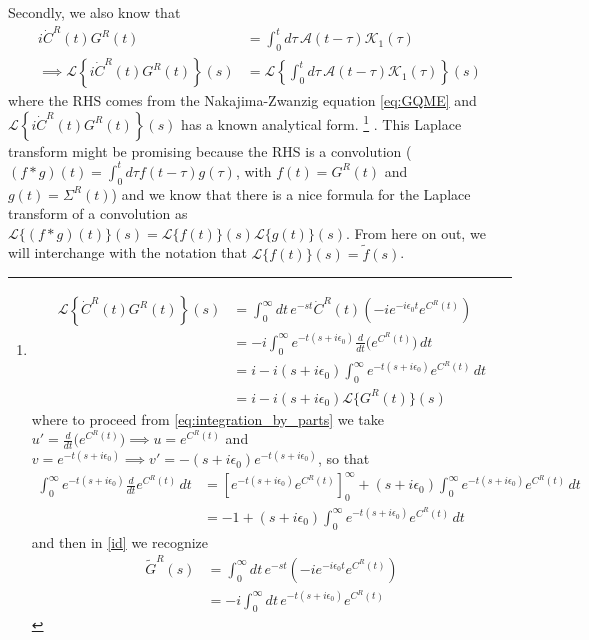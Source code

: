  Secondly, we also know that 
\begin{align}
i \dot{C}^R(t) G^R(t) &= \int_{0}^{t} d \tau\, \mathcal{A}(t - \tau) \mathcal{K}_1(\tau)  \\  
\implies \mathcal{L}\left\{i \dot{C}^R(t) G^R(t)\right\}(s) &= \mathcal{L}\left\{\int_{0}^{t} d \tau\, \mathcal{A}(t - \tau) \mathcal{K}_1(\tau)\right\}(s)
\end{align}
where the RHS comes from the Nakajima-Zwanzig equation \eqref{eq:GQME} and $\mathcal{L}\left\{i \dot{C}^R(t) G^R(t)\right\}(s) $ has a known analytical form.
\footnote{
\begin{align}
\mathcal{L}\left\{\dot{C}^R(t)G^R(t)\right\}(s)
&=\int_0^\infty dt\, e^{-s t} \dot{C}^R(t) \left(-i e^{-i \epsilon_0 t} e^{C^R(t)}\right) \\
&= -i \int_0^\infty e^{-t(s + i\epsilon_0)} \frac{d}{dt}\big(e^{C^R(t)}\big)\, dt \label{eq:integration_by_parts}\\
&= i - i(s + i\epsilon_0)\int_0^\infty e^{-t(s + i\epsilon_0)} e^{C^R(t)}\,dt \label{id}\\
&= i - i(s + i\epsilon_0)\mathcal{L}\{G^R(t)\}(s)
\end{align}
where to proceed from \eqref{eq:integration_by_parts} we take $u' = \frac{d}{dt}\big(e^{C^R(t)}\big) \implies u = e^{C^R(t)}$ and $v = e^{-t(s + i\epsilon_0)} \implies v' = - (s + i\epsilon_0)e^{-t(s + i\epsilon_0)}$, so that
\begin{align}
\int_0^\infty e^{-t(s + i\epsilon_0)} \frac{d}{dt}e^{C^R(t)}\,dt
&= \left[e^{-t(s + i\epsilon_0)} e^{C^R(t)}\right]_0^\infty 
+ (s + i\epsilon_0)\int_0^\infty e^{-t(s + i\epsilon_0)} e^{C^R(t)}\,dt \\
&= -1 + (s + i\epsilon_0)\int_0^\infty e^{-t(s + i\epsilon_0)} e^{C^R(t)}\,dt
\end{align}
and then in \eqref{id} we recognize 
\begin{align}
\tilde{G}^R(s)&=\int_0^\infty dt\, e^{-s t} \left(-i e^{-i \epsilon_0 t} e^{C^R(t)}\right) \\
&=-i \int_0^\infty dt\, e^{-t\left(s+i \epsilon_0\right)} e^{C^R(t)}
\end{align}
}
. This Laplace transform might be promising because the RHS is a convolution ($(f*g)(t)=\int_0^t d \tau f(t-\tau) g(\tau)$, with $f(t)=G^R(t)$ and $g(t)=\Sigma^R(t)$) and we know that there is a nice formula for the Laplace transform of a convolution as $\mathcal{L}\{(f*g)(t)\}(s)=\mathcal{L}\{f(t)\}(s) \mathcal{L}\{g(t)\}(s)$. From here on out, we will interchange with the notation that $\mathcal{L}\{f(t)\}(s)=\tilde{f}(s)$. 
